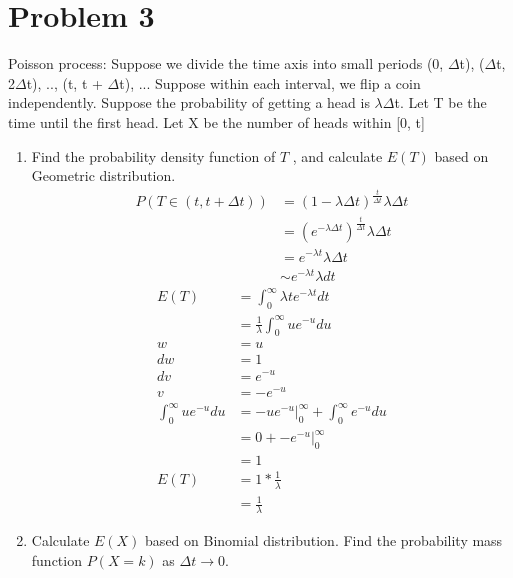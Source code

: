 \documentclass{article}
\begin{document}
    \section{Problem 3}
    Poisson process: Suppose we divide the time axis into small periods (0, $\Delta $t),
($\Delta $t, 2$\Delta $t), .., (t, t + $\Delta $t), ... Suppose within each interval, we flip a coin independently. Suppose
the probability of getting a head is $\lambda$$\Delta $t. Let T be the time until the first head. Let X be the
number of heads within [0, t]
    \begin{enumerate}
        \item
            Find the probability density function of $T$ , and calculate $E(T)$ based on Geometric distribution.
            \begin{align*}
                P(T \in (t, t+\Delta t)) &= (1-\lambda \Delta t)^{\frac{t}{\Delta t }}\lambda \Delta t\\
                                         &= (e^{-\lambda \Delta t })^{\frac{t}{\Delta t }}\lambda \Delta t\\
                                         &= e^{-\lambda t}\lambda \Delta t \\
                                         &\sim e^{-\lambda t}\lambda  dt 
            \end{align*}
            \begin{align*}
                E(T) &= \int_{0}^{\infty}\lambda te^{-\lambda t}dt\\
                     &= \frac{1}{\lambda }\int_{0}^{\infty}ue^{-u}du\\
                   w &= u \\
                  dw &= 1 \\
                  dv &= e^{-u}\\
                   v &= -e^{-u} \\
                   \int_{0}^{\infty}ue^{-u}du &= \left. -ue^{-u} \right|_{0}^{\infty} + \int_{0}^{\infty}e^{-u}du\\
                                              &= 0 + \left. -e^{-u} \right|_{0}^{\infty} \\
                                              &= 1 \\
                       E(T) &= 1 * \frac{1}{\lambda }\\
                            &= \frac{1}{\lambda }
            \end{align*}
        \item Calculate $E(X)$ based on Binomial distribution. Find the probability mass function $P (X = k)$ as $\Delta  t \rightarrow 0$.

\end{enumerate}$$
\end{document}
